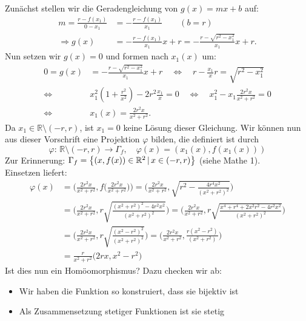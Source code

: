 \begin{Beispiel}
    Zunächst stellen wir die Geradengleichung von $g(x)=mx+b$ auf:
    \begin{align*}
        m=\frac{r-f(x_1)}{0-x_1}&=-\frac{r-f(x_1)}{x_1} \qquad (b=r) \\
        \Rightarrow g(x) &= -\frac{r-f(x_1)}{x_1}x+r=-\frac{r-\sqrt{r^2-x_1^2}}{x_1}x+r.
    \end{align*}
    Nun setzen wir $g(x)=0$ und formen nach $x_1(x)$ um:
    \begin{align*}
        0=g(x)&=-\frac{r-\sqrt{r^2-x_1^2}}{x_1}x+r \quad\Leftrightarrow\quad r-\frac{x_1}{x}r=\sqrt{r^2-x_1^2} \\
        \Leftrightarrow\quad &x_1^2(1+\frac{r^2}{x^2})-2r^2\frac{x_1}{x}=0 \quad\Leftrightarrow\quad x_1^2-x_1\frac{2r^2x}{x^2+r^2}=0 \\
        \Leftrightarrow\quad &x_1(x)=\frac{2r^2x}{x^2+r^2}.
    \end{align*}
    Da $x_1\in\mathbb{R}\setminus (-r,r)$, ist $x_1=0$ keine Lösung dieser Gleichung. Wir können nun aus dieser Vorschrift eine Projektion $\varphi$ bilden, die definiert ist durch
    \begin{equation*}
        \varphi:\,\mathbb{R}\setminus(-r,r)\longrightarrow \Gamma_f, \quad \varphi(x)=(x_1(x), f(x_1(x)))
    \end{equation*}
    Zur Erinnerung: $\Gamma_f=\left\{(x,f(x))\in\mathbb{R}^2\,|\, x\in(-r,r)\right\}$ (siehe Mathe 1). \\
    Einsetzen liefert:
    \begin{align*}
        \varphi(x)&=\Big( \frac{2r^2x}{x^2+r^2}, f\big( \frac{2r^2x}{x^2+r^2} \big) \Big) = \Big( \frac{2r^2x}{x^2+r^2},\sqrt{r^2-\frac{4r^4x^2}{(x^2+r^2)^2}} \Big) \\
        &= \Big( \frac{2r^2x}{x^2+r^2},r\sqrt{\frac{(x^2+r^2)^2-4r^2x^2}{(x^2+r^2)^2}} \Big) = \Big( \frac{2r^2x}{x^2+r^2},r\sqrt{\frac{x^4+r^4+2x^2r^2-4r^2x^2}{(x^2+r^2)^2}} \Big) \\
        &= \Big( \frac{2r^2x}{x^2+r^2},r\sqrt{\frac{(x^2-r^2)^2}{(x^2+r^2)^2}} \Big) = \Big( \frac{2r^2x}{x^2+r^2}, \frac{r(x^2-r^2)}{(x^2+r^2)} \Big) \\
        &=\frac{r}{x^2+r^2}\big( 2rx, x^2-r^2 \big)
    \end{align*}
    Ist dies nun ein Homöomorphismus? Dazu checken wir ab:
    \begin{itemize}
        \item Wir haben die Funktion so konstruiert, dass sie bijektiv ist
        \item Als Zusammensetzung stetiger Funktionen ist sie stetig

\end{itemize}
\end{Beispiel}
